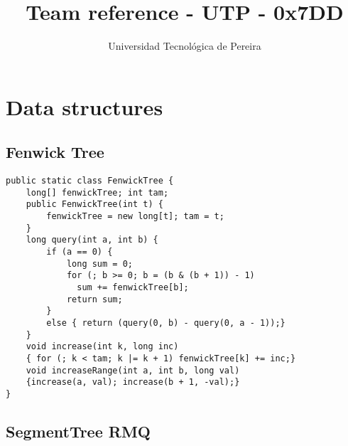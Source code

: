 \documentclass[10pt,letterpaper,twocolumn,twosided]{article}
\begin{document}
\title{Team reference - UTP - 0x7DD}
\author{Universidad Tecnológica de Pereira}
\maketitle
\tableofcontents
{}

\section{Data structures}

\subsection{Fenwick Tree}

\begin{lstlisting}
public static class FenwickTree {
    long[] fenwickTree; int tam;
    public FenwickTree(int t) {
        fenwickTree = new long[t]; tam = t;
    }
    long query(int a, int b) {
        if (a == 0) {
            long sum = 0;
            for (; b >= 0; b = (b & (b + 1)) - 1)
              sum += fenwickTree[b];
            return sum;
        } 
        else { return (query(0, b) - query(0, a - 1));}
    }
    void increase(int k, long inc) 
    { for (; k < tam; k |= k + 1) fenwickTree[k] += inc;}
    void increaseRange(int a, int b, long val)
    {increase(a, val); increase(b + 1, -val);}
}
\end{lstlisting}

\subsection{SegmentTree RMQ}
\end{document}
